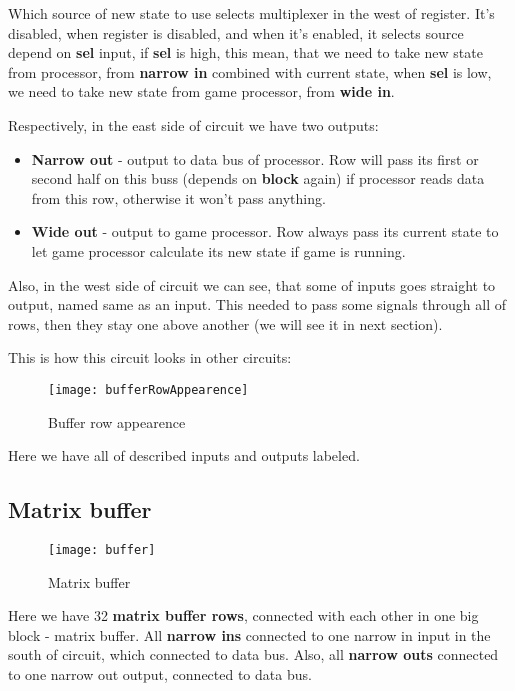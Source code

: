 Which source of new state to use selects multiplexer in the west of register. It's disabled, when register is disabled, and when it's enabled, it selects source depend on \textbf{sel} input, if \textbf{sel} is high, this mean, that we need to take new state from processor, from \textbf{narrow in} combined with current state, when \textbf{sel} is low, we need to take new state from game processor, from \textbf{wide in}.

Respectively, in the east side of circuit we have two outputs:

\begin{itemize}
	\item \textbf{Narrow out} - output to data bus of processor. Row will pass its first or second half on this buss (depends on \textbf{block} again) if processor reads data from this row, otherwise it won't pass anything.
	\item \textbf{Wide out} - output to game processor. Row always pass its current state to let game processor calculate its new state if game is running.
\end{itemize}

Also, in the west side of circuit we can see, that some of inputs goes straight to output, named same as an input. This needed to pass some signals through all of rows, then they stay one above another (we will see it in next section).

This is how this circuit looks in other circuits:

\begin{figure}[ht]
	\centering
	\texttt{[image: bufferRowAppearence]}
	\caption{Buffer row appearence}
\end{figure}

\clearpage

Here we have all of described inputs and outputs labeled.

\subsection*{Matrix buffer}

\begin{figure}[ht]
	\centering
	\texttt{[image: buffer]}
	\caption{Matrix buffer}
\end{figure}

Here we have 32 \textbf{matrix buffer rows}, connected with each other in one big block - matrix buffer. All \textbf{narrow ins} connected to one narrow in input in the south of circuit, which connected to data bus. Also, all \textbf{narrow outs} connected to one narrow out output, connected to data bus.

